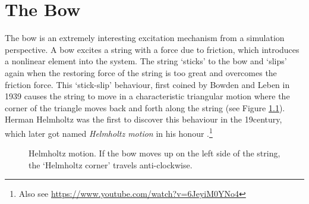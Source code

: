 \chapter{The Bow}\label{ch:bow}
The bow is an extremely interesting excitation mechanism from a simulation perspective.
A bow excites a string with a force due to friction, which introduces a nonlinear element into the system.
The string `sticks' to the bow and `slips' again when the restoring force of the string is too great and overcomes the friction force. This `stick-slip' behaviour, first coined by Bowden and Leben in 1939 \cite{Bowden1939} causes the string to move in a characteristic triangular motion where the corner of the triangle moves back and forth along the string (see Figure \ref{fig:helmholtz}). Herman Helmholtz was the first to discover this behaviour in the 19\th century, which later got named \textit{Helmholtz motion} in his honour \cite{Helmholtz1860}.\footnote{Also see \url{https://www.youtube.com/watch?v=6JeyiM0YNo4}}

\begin{figure}[h]
    \centering
    \caption{Helmholtz motion. If the bow moves up on the left side of the string, the `Helmholtz corner' travels anti-clockwise. \label{fig:helmholtz}}
\end{figure}

